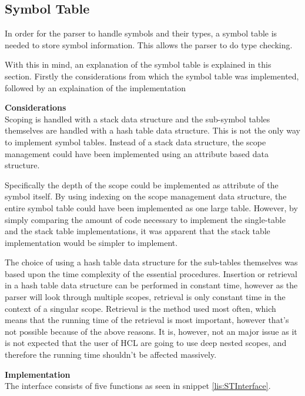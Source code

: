 \subsection{Symbol Table}
\label{sec:symbolTable}
In order for the parser to handle symbols and their types, a symbol table is needed to store symbol information.
This allows the parser to do type checking.

With this in mind, an explanation of the symbol table is explained in this section. 
Firstly the considerations from which the symbol table was implemented, followed by an explaination of the implementation

\textbf{Considerations}\\
Scoping is handled with a stack data structure and the sub-symbol tables themselves are handled with a hash table data structure.
This is not the only way to implement symbol tables.
Instead of a stack data structure, the scope management could have been implemented using an attribute based data structure.

Specifically the depth of the scope could be implemented as attribute of the symbol itself.
By using indexing on the scope management data structure, the entire symbol table could have been implemented as one large table.
However, by simply comparing the amount of code necessary to implement the single-table and the stack table implementations, it was apparent that the stack table implementation would be simpler to implement.

The choice of using a hash table data structure for the sub-tables themselves was based upon the time complexity of the essential procedures.
Insertion or retrieval in a hash table data structure can be performed in constant time, however as the parser will look through multiple scopes, retrieval is only constant time in the context of a singular scope.
Retrieval is the method used most often, which means that the running time of the retrieval is most important, however that's not possible because of the above reasons. 
It is, however, not an major issue as it is not expected that the user of HCL are going to use deep nested scopes, and therefore the running time shouldn't be affected massively.



\textbf{Implementation}\\
The interface consists of five functions as seen in snippet \ref{lis:STInterface}.

